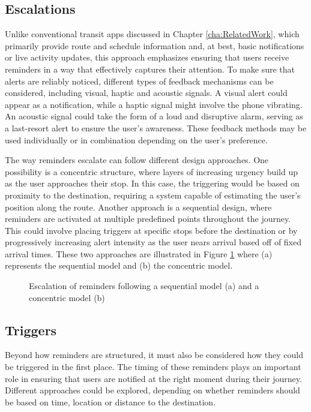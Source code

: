 \subsection{Escalations}
\label{sec:escalations}
Unlike conventional transit apps discussed in Chapter \ref{cha:RelatedWork}, which primarily provide route and schedule information and, at best, basic notifications or live activity updates, this approach emphasizes ensuring that users receive reminders in a way that effectively captures their attention. 
To make sure that alerts are reliably noticed, different types of feedback mechanisms can be considered, including visual, haptic and acoustic signals. 
A visual alert could appear as a notification, while a haptic signal might involve the phone vibrating.
An acoustic signal could take the form of a loud and disruptive alarm, serving as a last-resort alert to ensure the user's awareness.
These feedback methods may be used individually or in combination depending on the user's preference.

The way reminders escalate can follow different design approaches. 
One possibility is a concentric structure, where layers of increasing urgency build up as the user approaches their stop. 
In this case, the triggering would be based on proximity to the destination, requiring a system capable of estimating the user's position along the route. 
Another approach is a sequential design, where reminders are activated at multiple predefined points throughout the journey. 
This could involve placing triggers at specific stops before the destination or by progressively increasing alert intensity as the user nears arrival based off of fixed arrival times.
These two approaches are illustrated in Figure \ref{fig:reminderescalations} where (a) represents the sequential model and (b) the concentric model.

\begin{figure}[htbp]%
    \centering
    \qquad
    \caption{Escalation of reminders following a sequential model (a) and a concentric model (b)}%
    \label{fig:reminderescalations}%
\end{figure}

\subsection{Triggers}
Beyond how reminders are structured, it must also be considered how they could be triggered in the first place. 
The timing of these reminders plays an important role in ensuring that users are notified at the right moment during their journey. 
Different approaches could be explored, depending on whether reminders should be based on time, location or distance to the destination.

